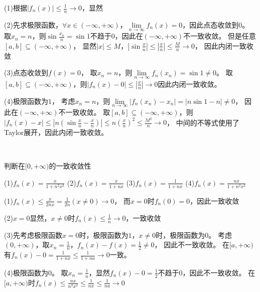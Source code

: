 \begin{solution}
  (1)根据$|f_n(x)| \leq \frac{1}{n} \rightarrow 0$，显然

  (2)先求极限函数，$\forall x \in (-\infty, +\infty)$，$\lim \limits _{n \rightarrow \infty} f_n(x) = 0$，因此点态收敛到$0$。
  取$x_n = n$，则$\sin \frac{x_n}{n} = \sin 1$不趋于$0$，因此在$(-\infty,+\infty)$不一致收敛。
  但是任意$[a,b] \subseteq (-\infty,+\infty)$，
  显然$|x| \leq M$，$|\sin \frac{x}{n}| \leq |\frac{x}{n}| \leq \frac{M}{n} \rightarrow 0$，
  因此内闭一致收敛

  (3)点态收敛到$f(x) = 0$，
  取$x_n = n$，则$\lim \limits _{n \rightarrow \infty} f_n(x_n) = \sin 1 \neq 0$。
  取$[a,b] \subseteq (-\infty,+\infty)$，则$|f_n(x) - 0| \leq |\frac{x}{n}| \rightarrow 0$因此内闭一致收敛。

  (4)极限函数为$1$，
  考虑$x_n = n$，则$\lim \limits _{n \rightarrow \infty} |f_n(x_n) - x_n| = |n \sin 1 - n| \neq 0$，
  因此在$(-\infty,+\infty)$不一致收敛。
  取$[a,b] \subseteq (-\infty, +\infty)$，则$|f_n(x) - x| \leq |n (\sin \frac{x}{n} - \frac{x}{n})| \leq n(\frac{x}{n})^2 \leq \frac{M^2}{n} \rightarrow 0$，
  中间的不等式使用了Taylor展开，因此内闭一致收敛。
\end{solution}

~

\begin{exercise}[分式相关]
  判断在$[0,+\infty)$的一致收敛性

  (1)$f_n(x) = \frac{x}{1 + n^2 x^2}$
  (2)$f_n(x) = \frac{x}{1 + nx}$
  (3)$f_n(x) = \frac{1}{1 + nx}$
  (4)$f_n(x) = \frac{nx}{1 + n^2x^2}$
\end{exercise}

\begin{solution}
  (1)$f_n(x) \leq \frac{x}{2nx} = \frac{1}{2n}(x \neq 0) \rightarrow 0$，
  而$x = 0$时$f_n(0) = 0$，因此一致收敛

  (2)$x = 0$显然，$x \neq 0$时$f_n(x) \leq \frac{1}{n} \rightarrow 0$，一致收敛

  (3)先考虑极限函数$x = 0$时，极限函数为$1$，$x \neq 0$时，极限函数为$0$。
  考虑$(0,+\infty)$，取$x_n = \frac{1}{n}$，$f_n(x) - f(x) = \frac{1}{2} \neq 0$，
  因此不一致收敛。
  在$[a,+\infty)$有$f_n(x) - 0 = \frac{1}{1 + nx} \leq \frac{1}{1 + na} \rightarrow 0$一致。

  (4)极限函数为$0$。
  取$x_n = \frac{1}{n}$，显然$f_n(x) - 0 = \frac{1}{2}$不趋于$0$，因此不一致收敛。
  在$[a,+\infty)$时$f_n(x) \leq \frac{nx}{n^2x^2} \leq \frac{1}{nx} \leq \frac{1}{na} \rightarrow 0$
\end{solution}

